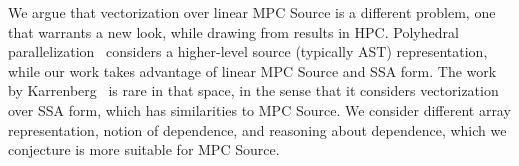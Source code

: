 We argue that vectorization over linear MPC Source is a different problem, one that warrants a new look, while drawing from
results in HPC.
Polyhedral parallelization~\cite{Benabderrahmane:2010} considers a higher-level source (typically AST)
representation, while our work takes advantage of linear MPC Source and SSA form. The work by Karrenberg~\cite{Karrenberg:2015} is rare in that space, in the sense that it considers
vectorization over SSA form, which has similarities to MPC Source. We consider different array representation, notion of dependence, and reasoning
about dependence, which we conjecture is more suitable for MPC Source. 
